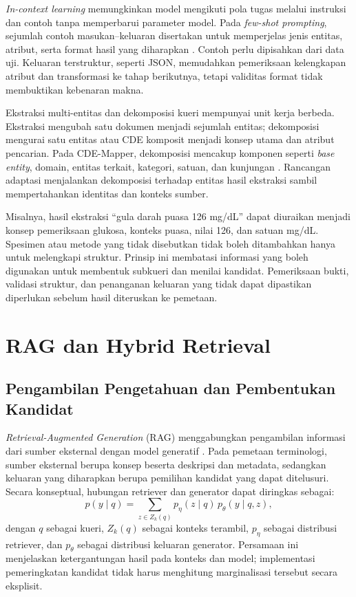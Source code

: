 \textit{In-context learning} memungkinkan model mengikuti pola tugas melalui instruksi dan contoh tanpa memperbarui parameter model. Pada \textit{few-shot prompting}, sejumlah contoh masukan--keluaran disertakan untuk memperjelas jenis entitas, atribut, serta format hasil yang diharapkan \citep{brown_language_2020}. Contoh perlu dipisahkan dari data uji. Keluaran terstruktur, seperti JSON, memudahkan pemeriksaan kelengkapan atribut dan transformasi ke tahap berikutnya, tetapi validitas format tidak membuktikan kebenaran makna.

Ekstraksi multi-entitas dan dekomposisi kueri mempunyai unit kerja berbeda. Ekstraksi mengubah satu dokumen menjadi sejumlah entitas; dekomposisi mengurai satu entitas atau CDE komposit menjadi konsep utama dan atribut pencarian. Pada CDE-Mapper, dekomposisi mencakup komponen seperti \textit{base entity}, domain, entitas terkait, kategori, satuan, dan kunjungan \citep{gilani_cde-mapper_2025}. Rancangan adaptasi menjalankan dekomposisi terhadap entitas hasil ekstraksi sambil mempertahankan identitas dan konteks sumber.

Misalnya, hasil ekstraksi ``gula darah puasa 126 mg/dL'' dapat diuraikan menjadi konsep pemeriksaan glukosa, konteks puasa, nilai 126, dan satuan mg/dL. Spesimen atau metode yang tidak disebutkan tidak boleh ditambahkan hanya untuk melengkapi struktur. Prinsip ini membatasi informasi yang boleh digunakan untuk membentuk subkueri dan menilai kandidat. Pemeriksaan bukti, validasi struktur, dan penanganan keluaran yang tidak dapat dipastikan diperlukan sebelum hasil diteruskan ke pemetaan.

\section{RAG dan Hybrid Retrieval}

\subsection{Pengambilan Pengetahuan dan Pembentukan Kandidat}

\textit{Retrieval-Augmented Generation} (RAG) menggabungkan pengambilan informasi dari sumber eksternal dengan model generatif \citep{lewis_retrieval-augmented_2021}. Pada pemetaan terminologi, sumber eksternal berupa konsep beserta deskripsi dan metadata, sedangkan keluaran yang diharapkan berupa pemilihan kandidat yang dapat ditelusuri. Secara konseptual, hubungan retriever dan generator dapat diringkas sebagai:
\begin{equation}
 p(y\mid q)=\sum_{z\in Z_k(q)}p_{\eta}(z\mid q)\,p_{\theta}(y\mid q,z),
 \label{eq:rag-probabilistic}
\end{equation}
 dengan $q$ sebagai kueri, $Z_k(q)$ sebagai konteks terambil, $p_{\eta}$ sebagai distribusi retriever, dan $p_{\theta}$ sebagai distribusi keluaran generator. Persamaan ini menjelaskan ketergantungan hasil pada konteks dan model; implementasi pemeringkatan kandidat tidak harus menghitung marginalisasi tersebut secara eksplisit.

